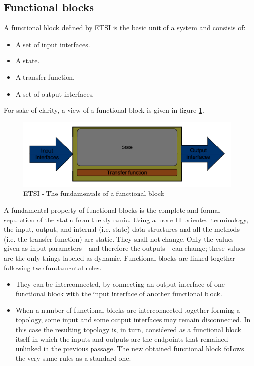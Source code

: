 \subsection{Functional blocks}
A functional block defined by ETSI is the basic unit of a system and consists of:
\begin{itemize}
	\item A set of input interfaces.
	\item A state.
	\item A transfer function.
	\item A set of output interfaces.
\end{itemize}
For sake of clarity, a view of a functional block is given in figure \ref{fig:functional_block}.
\begin{figure}[h]
	\centering
	\includegraphics[clip= true, width= \columnwidth]{images/functional_block.png}
		\caption{ETSI - The fundamentals of a functional block}
	\label{fig:functional_block}
\end{figure}
A fundamental property of functional blocks is the complete and formal separation of the static from the dynamic. Using a more IT oriented terminology, the input, output, and internal (i.e. state) data structures and all the methods (i.e. the transfer function) are static. They shall not change. Only the values given as input parameters - and therefore the outputs - can change; these values are the only things labeled as dynamic.
Functional blocks are linked together following two fundamental rules:
\begin{itemize}
	\item They can be interconnected, by connecting an output interface of one functional block with the input interface of another functional block.
	\item When a number of functional blocks are interconnected together forming a topology, some input and some output interfaces may remain disconnected. In this case the resulting topology is, in turn, considered as a functional block itself in which the inputs and outputs are the endpoints that remained unlinked in the previous passage. The new obtained functional block follows the very same rules as a standard one.
\end{itemize}

